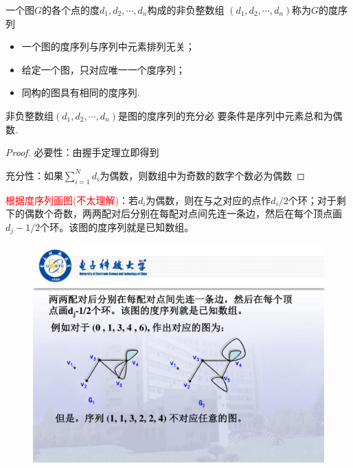 \noindent {\bfseries \textcolor{ecolor}{图的度序列及其性质：}}
\begin{definition}[度序列]
一个图$G$的各个点的度$d_1, d_2 , \cdots , d_n$构成的非负整数组
$(d_1, d_2,\cdots , d_n)$称为$G$的度序列
\end{definition}
\begin{note}
	\begin{itemize}
		\item 一个图的度序列与序列中元素排列无关；
		\item 给定一个图，只对应唯一一个度序列；
		\item 同构的图具有相同的度序列.
	\end{itemize}
\end{note}
\begin{theorem}
	非负整数组$(d_1, d_2, \cdots, d_n)$是图的度序列的充分必
	要条件是序列中元素总和为偶数.
\end{theorem}
\begin{proof}
\noindent 必要性：由握手定理立即得到

\noindent 充分性：如果$\sum\limits_{i=1}^{N} d_i$为偶数，则数组中为奇数的数字个数必为偶数 
\end{proof}

\noindent \textcolor{red}{根据度序列画图(不太理解)}：若$d_i$为偶数，则在与之对应的点作$d_i/2$个环；对于剩下的偶数个奇数，两两配对后分别在每配对点间先连一条边，然后在每个顶点画$d_j-1/2$个环。该图的度序列就是已知数组。

\begin{figure}[H]
	\small
	\centering 
	\includegraphics[scale=0.5]{image/duxulie.pdf}  
	\label{fig1k}  
\end{figure}


